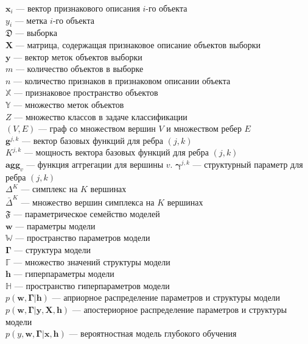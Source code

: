 \noindent$\mathbf{x}_i$ --- вектор признакового описания $i$-го объекта\\
$y_i$ --- метка $i$-го объекта\\
$\mathfrak{D}$ --- выборка\\
$\mathbf{X}$ --- матрица, содержащая признаковое описание объектов выборки\\
$\mathbf{y}$ --- вектор меток объектов выборки\\
$m$ --- количество объектов в выборке\\
$n$ --- количество признаков в признаковом описании объекта\\
$\mathbb{X}$ --- признаковое пространство объектов\\
$\mathbb{Y}$ --- множество меток объектов\\
$Z$ --- множество классов в задаче классификации\\
$(V,E)$ --- граф со множеством вершин $V$ и множеством ребер $E$\\
$\mathbf{g}^{j,k}$ --- вектор базовых функций для ребра $(j,k)$\\
$K^{j,k}$ --- мощность вектора базовых функций для ребра $(j,k)$\\
$\textbf{agg}_v$ --- функция аггрегации для вершины $v$. 
$\boldsymbol{\gamma}^{j,k}$ --- структурный параметр для ребра $(j,k)$\\
$\Delta^{K}$ --- симплекс на $K$ вершинах\\
$\bar{\Delta}^{K}$ --- множество вершин симплекса на $K$ вершинах\\
$\mathfrak{F}$ --- параметрическое семейство моделей\\
$\mathbf{w}$ --- параметры модели\\
$\mathbb{W}$ --- пространство параметров модели\\
$\boldsymbol{\Gamma}$ --- структура модели\\
$\mathbb{\Gamma}$ --- множество значений структуры модели\\
$\mathbf{h}$ --- гиперпараметры модели\\
$\mathbb{H}$ --- пространство гиперпараметров модели\\
$p(\mathbf{w}, \boldsymbol{\Gamma}|\mathbf{h})$ --- априорное распределение параметров и структуры модели\\
$p(\mathbf{w}, \boldsymbol{\Gamma}|\mathbf{y}, \mathbf{X}, \mathbf{h})$ --- апостериорное распределение параметров и структуры модели\\
$p({y}, \mathbf{w},  \boldsymbol{\Gamma}|\mathbf{x}, \mathbf{h})$ --- вероятностная модель глубокого обучения\\
